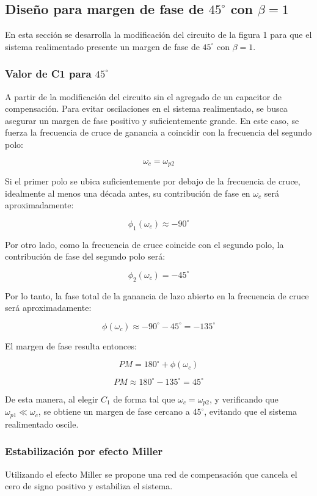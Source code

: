 \subsection[Diseño para margen de fase de 45° con beta=1]{Diseño para margen de fase de $45^\circ$ con $\beta=1$}
En esta sección se desarrolla la modificación del circuito de la figura 1 para que el sistema realimentado presente un margen de fase de $45^\circ$ con $\beta=1$.

\subsubsection[Valor de C1 para 45°]{Valor de C1 para $45^\circ$}

A partir de la modificación del circuito sin el agregado de un capacitor de compensación.
Para evitar oscilaciones en el sistema realimentado, se busca asegurar un margen de fase positivo y suficientemente grande. 
En este caso, se fuerza la frecuencia de cruce de ganancia a coincidir con la frecuencia del segundo polo:

\[
\omega_c=\omega_{p2}
\]

Si el primer polo se ubica suficientemente por debajo de la frecuencia de cruce, idealmente al menos una década antes, su contribución de fase en \(\omega_c\) será aproximadamente:

\[
\phi_1(\omega_c)\approx -90^\circ
\]

Por otro lado, como la frecuencia de cruce coincide con el segundo polo, la contribución de fase del segundo polo será:

\[
\phi_2(\omega_c)=-45^\circ
\]

Por lo tanto, la fase total de la ganancia de lazo abierto en la frecuencia de cruce será aproximadamente:

\[
\phi(\omega_c)\approx -90^\circ-45^\circ=-135^\circ
\]

El margen de fase resulta entonces:

\[
PM = 180^\circ + \phi(\omega_c)
\]

\[
PM \approx 180^\circ - 135^\circ = 45^\circ
\]

De esta manera, al elegir \(C_1\) de forma tal que \(\omega_c=\omega_{p2}\), y verificando que \(\omega_{p1}\ll \omega_c\), se obtiene un margen de fase cercano a \(45^\circ\), evitando que el sistema realimentado oscile.

\vspace{3em}

\subsubsection{Estabilización por efecto Miller}
Utilizando el efecto Miller se propone una red de compensación que cancela el cero de signo positivo y estabiliza el sistema.
\vspace{3em}

